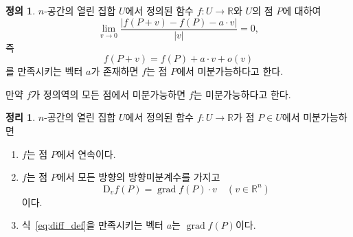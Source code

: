 \documentclass[unfonts,oneside,a4paper]{oblivoir}
\theoremstyle{definition}
\newtheorem{definition}{정의}[subsubsection]
\theoremstyle{theorem}
\newtheorem{theorem}{정리}[subsubsection]
\renewcommand{\vec}[1]{\bm{\mathit{#1}}}
\newcommand{\vecz}{\bm{\mathrm{0}}}
\newcommand{\dD}{\mathrm{D}}
\DeclareMathOperator{\grad}{grad}
\begin{document}
\begin{definition}
    $n$-공간의 열린 집합 $U$에서 정의된 함수 $f: U \rightarrow \mathbb R$와 $U$의 점 $P$에 대하여
    \begin{equation} \label{eq:diff_def}
        \lim_{\vec v \rightarrow \vecz} \frac{|f(P + \vec v) - f(P) - \vec a \cdot \vec v|}{|\vec v|} = 0,
    \end{equation}
    즉
    \begin{equation} \label{eq:diff_alt_def}
        f(P + \vec v) = f(P) + \vec a \cdot \vec v + o(\vec v)
    \end{equation}
    를 만족시키는 벡터 $\vec a$가 존재하면 $f$는 점 $P$에서 미분가능하다고 한다.

    만약 $f$가 정의역의 모든 점에서 미분가능하면 $f$는 미분가능하다고 한다.
\end{definition}

\begin{theorem}
    $n$-공간의 열린 집합 $U$에서 정의된 함수 $f:U \rightarrow \mathbb R$가 점 $P \in U$에서 미분가능하면
    \begin{enumerate}
        \item $f$는 점 $P$에서 연속이다.
        \item $f$는 점 $P$에서 모든 방향의 방향미분계수를 가지고
            \begin{equation*}
                \dD_{\vec v} f(P) = \grad f(P) \cdot \vec v \quad (\vec v \in \mathbb R^n)
            \end{equation*}
            이다.
        \item 식~\ref{eq:diff_def}을 만족시키는 벡터 $\vec a$는 $\grad f(P)$이다.
    \end{enumerate}
\end{theorem}
\end{document}
